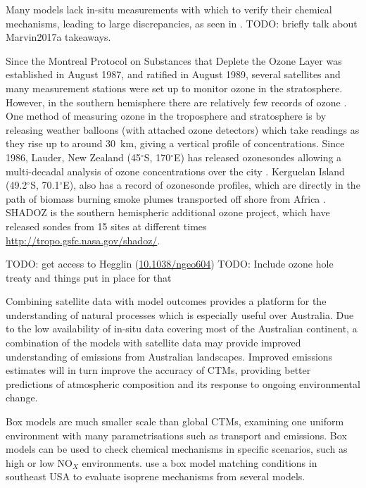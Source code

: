       Many models lack in-situ measurements with which to verify their chemical mechanisms, leading to large discrepancies, as seen in \cite{Marvin2017a}.
      TODO: briefly talk about Marvin2017a takeaways.
      
      
      Since the Montreal Protocol on Substances that Deplete the Ozone Layer was established in August 1987, and ratified in August 1989, several satellites and many measurement stations were set up to monitor ozone in the stratosphere.
      However, in the southern hemisphere there are relatively few records of ozone \citep{Huang2017}.
      One method of measuring ozone in the troposphere and stratosphere is by releasing weather balloons (with attached ozone detectors) which take readings as they rise up to around 30~km, giving a vertical profile of concentrations.
      Since 1986, Lauder, New Zealand (45$^{\circ}$S, 170$^{\circ}$E) has released ozonesondes allowing a multi-decadal analysis of ozone concentrations over the city \citep{Brinksma2002}.
      Kerguelan Island (49.2$^{\circ}$S, 70.1$^{\circ}$E), also has a record of ozonesonde profiles, which are directly in the path of biomass burning smoke plumes transported off shore from Africa \citep{Baray2012}.
      SHADOZ is the southern hemispheric additional ozone project, which have released sondes from 15 sites at different times \url{http://tropo.gsfc.nasa.gov/shadoz/}.
      
      TODO: get access to Hegglin (\url{10.1038/ngeo604}) \citep{Hegglin2009}
      TODO: Include ozone hole treaty and things put in place for that
      
      Combining satellite data with model outcomes provides a platform for the understanding of natural processes which is especially useful over Australia.
      Due to the low availability of in-situ data covering most of the Australian continent, a combination of the models with satellite data may provide improved understanding of emissions from Australian landscapes.
      Improved emissions estimates will in turn improve the accuracy of CTMs, providing better predictions of atmospheric composition and its response to ongoing environmental change.
      
      Box models are much smaller scale than global CTMs, examining one uniform environment with many parametrisations such as transport and emissions.
      Box models can be used to check chemical mechanisms in specific scenarios, such as high or low NO$_X$ environments.
      \cite{Marvin2017} use a box model matching conditions in southeast USA to evaluate isoprene mechanisms from several models.
      
